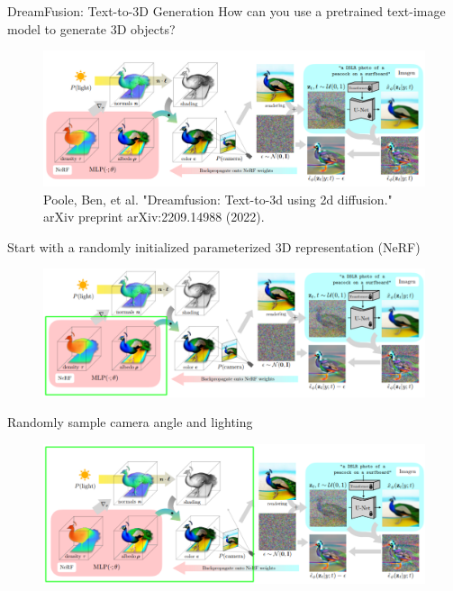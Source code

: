 \begin{frame}[allowframebreaks]{DreamFusion: Text-to-3D Generation}
    \large How can you use a pretrained text-image model to generate 3D objects?
    \begin{figure}
        \centering
        \includegraphics[width=1.05\linewidth,height=\textheight,keepaspectratio]{images/adv-img-gen/slide_151_1_img.png}
        \caption*{Poole, Ben, et al. "Dreamfusion: Text-to-3d using 2d diffusion." arXiv preprint arXiv:2209.14988 (2022).}
    \end{figure}

    \framebreak
    \large Start with a randomly initialized parameterized 3D representation (NeRF)
    \begin{figure}
        \centering
        \includegraphics[width=1.05\linewidth,height=\textheight,keepaspectratio]{images/adv-img-gen/slide_152_1_img.png}
    \end{figure}

    \framebreak
    \large Randomly sample camera angle and lighting
    \begin{figure}
        \centering
        \includegraphics[width=1.05\linewidth,height=\textheight,keepaspectratio]{images/adv-img-gen/slide_153_1_img.png}
    \end{figure}


\end{frame}
